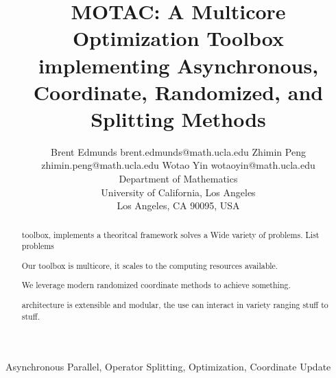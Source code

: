 \documentclass[twoside,11pt]{article}
\newcommand{\pkg}{{MOTAC}}
\begin{document}
\title{\pkg: A Multicore Optimization Toolbox implementing Asynchronous, Coordinate, Randomized, and Splitting Methods}

\author{\name Brent Edmunds \email brent.edmunds@math.ucla.edu
       \AND
       \name Zhimin Peng \email zhimin.peng@math.ucla.edu
       \AND
        \name Wotao Yin \email wotaoyin@math.ucla.edu \\
       \addr Department of Mathematics\\
       University of California, Los Angeles\\
       Los Angeles, CA 90095, USA}      

\maketitle

\begin{abstract}
toolbox, implements a theoritcal framework solves a  Wide variety of problems.
        List problems

Our toolbox is multicore, it scales to the computing resources available.

We leverage modern randomized coordinate methods to achieve something.

architecture is extensible and modular, the use can interact in variety ranging stuff to stuff.
\end{abstract}

\begin{keywords}
Asynchronous Parallel, Operator Splitting, Optimization, Coordinate Update
\end{keywords}








% 

%

%

%


% 


% 

% 

% 




\end{document}
